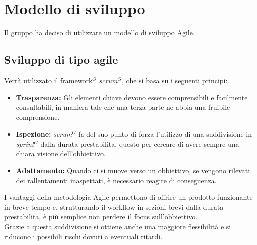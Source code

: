 \section{Modello di sviluppo}
Il gruppo ha deciso di utilizzare un modello di sviluppo Agile.

\subsection {Sviluppo di tipo agile}
Verrà utilizzato il framework$^{G}$ \textit{scrum}$^{G}$, che si basa su i seguenti principi:
\begin{itemize}
    \item \textbf{Trasparenza:} Gli elementi chiave devono essere comprensibili e facilmente consultabili, in maniera tale che una terza parte ne abbia una fruibile comprensione.
    
    \item \textbf{Ispezione:} \textit{scrum}$^{G}$ fa del suo punto di forza l'utilizzo di una suddivisione in \textit{sprint}$^{G}$ dalla durata prestabilita, questo per cercare di avere sempre una chiara visione dell'obbiettivo.
    
    \item \textbf{Adattamento:} Quando ci si muove verso un obbiettivo, se vengono rilevati dei rallentamenti inaspettati, è necessario reagire di conseguenza.
\end{itemize}
I vantaggi della metodologia Agile permettono di offrire un prodotto funzionante in breve tempo e, strutturando il workflow in sezioni brevi dalla durata prestabilita, è più semplice non perdere il focus sull'obbiettivo. \\
Grazie a questa suddivisione si ottiene anche una maggiore flessibilità e si riducono i possibili rischi dovuti a eventuali ritardi.